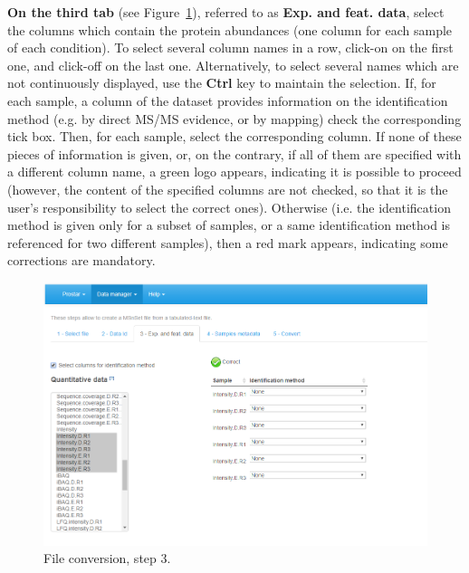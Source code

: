 \documentclass[12pt]{article}
\begin{document}
\textbf{On the third tab} (see Figure~\ref{fig:imp3}), referred to as \textbf{Exp. and feat. data},
select the columns which contain the protein abundances (one column for each sample of each condition). To select several column names in a row, click-on on the first one, and click-off on the last one. Alternatively, to select several names which are not continuously displayed, use the \textbf{Ctrl} key to maintain the selection.
If, for each sample, a column of the dataset provides information on the identification method (e.g. by direct MS/MS evidence, or by mapping) check the corresponding tick box. Then, for each sample, select the corresponding column. If none of these pieces of information is given, or, on the contrary, if all of them are specified with a different column name, a green logo appears, indicating it is possible to proceed (however, the content of the specified columns are not checked, so that it is the user's responsibility to select the correct ones). Otherwise (i.e. the identification method is given only for a subset of samples, or a same identification method is referenced for two different samples), then a red mark appears, indicating some corrections are mandatory.
\begin {figure}
\includegraphics[width=\textwidth]{images/convert_exp_featdata.png}
\caption{File conversion, step 3.}\label{fig:imp3}
\end {figure}
\end{document}
